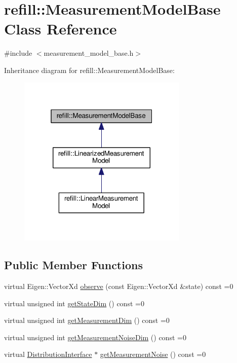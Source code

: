 \hypertarget{classrefill_1_1MeasurementModelBase}{}\section{refill\+:\+:Measurement\+Model\+Base Class Reference}
\label{classrefill_1_1MeasurementModelBase}


{\ttfamily \#include $<$measurement\+\_\+model\+\_\+base.\+h$>$}



Inheritance diagram for refill\+:\+:Measurement\+Model\+Base\+:\nopagebreak
\begin{figure}[H]
\begin{center}
\leavevmode
\includegraphics[width=229pt]{classrefill_1_1MeasurementModelBase__inherit__graph}
\end{center}
\end{figure}
\subsection*{Public Member Functions}
\begin{DoxyCompactItemize}
\item 
virtual Eigen\+::\+Vector\+Xd \hyperlink{classrefill_1_1MeasurementModelBase_a3a5613bc1ba3317e35436fc78b0d2972}{observe} (const Eigen\+::\+Vector\+Xd \&state) const =0
\item 
virtual unsigned int \hyperlink{classrefill_1_1MeasurementModelBase_a53ba9314f3246cc7bcaac67b47b47949}{get\+State\+Dim} () const =0
\item 
virtual unsigned int \hyperlink{classrefill_1_1MeasurementModelBase_a7421f11cf3153252d5e4309d2d0ba96d}{get\+Measurement\+Dim} () const =0
\item 
virtual unsigned int \hyperlink{classrefill_1_1MeasurementModelBase_a0cc78094412f6251cbeaeca3b037ece3}{get\+Measurement\+Noise\+Dim} () const =0
\item 
virtual \hyperlink{classrefill_1_1DistributionInterface}{Distribution\+Interface} $\ast$ \hyperlink{classrefill_1_1MeasurementModelBase_a32d1e80e656afeadf299442ef6280b2b}{get\+Measurement\+Noise} () const =0
\end{DoxyCompactItemize}


